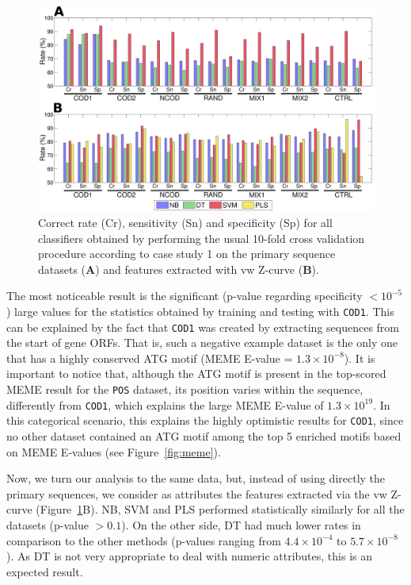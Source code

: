 \documentclass[conference]{IEEEtran}
\begin{document}
\begin{figure}
\vspace{0.0cm}
    \centering
    \includegraphics[width=1.0\textwidth]{Figs/Fig.pdf}
    \caption{Correct rate (Cr), sensitivity (Sn) and specificity (Sp) for all classifiers obtained by performing the usual 10-fold cross validation procedure according to case study 1 on the primary sequence datasets ({\bf A}) and features extracted with vw Z-curve ({\bf B}). }
    \label{fig:barplot}
\end{figure}

The most noticeable result is the significant (p-value regarding specificity $< 10^{-5} $) large values for the statistics obtained by training and testing with {\tt COD1}. This can be explained by the fact that {\tt COD1} was created by extracting sequences from the start of gene ORFs. That is, such a negative example dataset is the only one that has a highly conserved ATG motif (MEME E-value = $1.3\times10^{-8}$). It is important to notice that, although the ATG motif is present in the top-scored MEME result for the {\tt POS} dataset, its position varies within the sequence, differently from {\tt COD1}, which explains the large MEME E-value of $1.3\times10^{19}$. In this categorical scenario, this explains the highly optimistic results for {\tt COD1}, since no other dataset contained an ATG motif among the top 5 enriched motifs based on MEME E-values (see Figure~\ref{fig:meme}).

Now, we turn our analysis to the same data, but, instead of using directly the primary sequences, we consider as attributes the features extracted via the vw Z-curve (Figure~\ref{fig:barplot}B). NB, SVM and PLS performed statistically similarly for all the datasets (p-value $> 0.1$). On the other side, DT had much lower rates in comparison to the other methods (p-values ranging from $4.4\times10^{-4}$ to $5.7\times10^{-8}$). As DT is not very appropriate to deal with numeric attributes, this is an expected result. 
\end{document}
